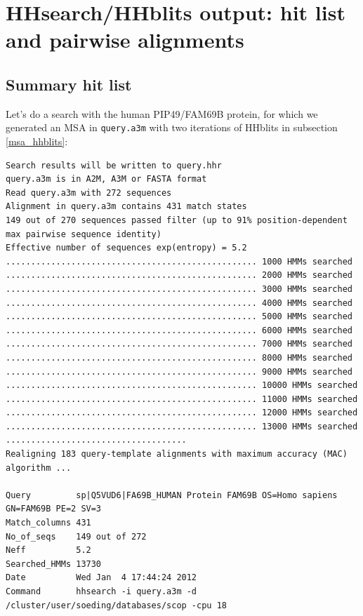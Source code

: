\documentclass[11pt,a4paper]{article}
\begin{document}
\section{HHsearch/HHblits output: hit list and pairwise alignments}\label{outformat}

\subsection{Summary hit list}

Let's do a search with the human PIP49/FAM69B protein, for which we generated an MSA in \verb`query.a3m` with two iterations of HHblits in subsection \ref{msa_hhblits}:

\scriptsize
\begin{verbatim}
Search results will be written to query.hhr
query.a3m is in A2M, A3M or FASTA format
Read query.a3m with 272 sequences
Alignment in query.a3m contains 431 match states
149 out of 270 sequences passed filter (up to 91% position-dependent max pairwise sequence identity)
Effective number of sequences exp(entropy) = 5.2 
.................................................. 1000 HMMs searched
.................................................. 2000 HMMs searched
.................................................. 3000 HMMs searched
.................................................. 4000 HMMs searched
.................................................. 5000 HMMs searched
.................................................. 6000 HMMs searched
.................................................. 7000 HMMs searched
.................................................. 8000 HMMs searched
.................................................. 9000 HMMs searched
.................................................. 10000 HMMs searched
.................................................. 11000 HMMs searched
.................................................. 12000 HMMs searched
.................................................. 13000 HMMs searched
....................................
Realigning 183 query-template alignments with maximum accuracy (MAC) algorithm ...

Query         sp|Q5VUD6|FA69B_HUMAN Protein FAM69B OS=Homo sapiens GN=FAM69B PE=2 SV=3
Match_columns 431
No_of_seqs    149 out of 272
Neff          5.2 
Searched_HMMs 13730
Date          Wed Jan  4 17:44:24 2012
Command       hhsearch -i query.a3m -d /cluster/user/soeding/databases/scop -cpu 18 


\end{verbatim}
\end{document}
